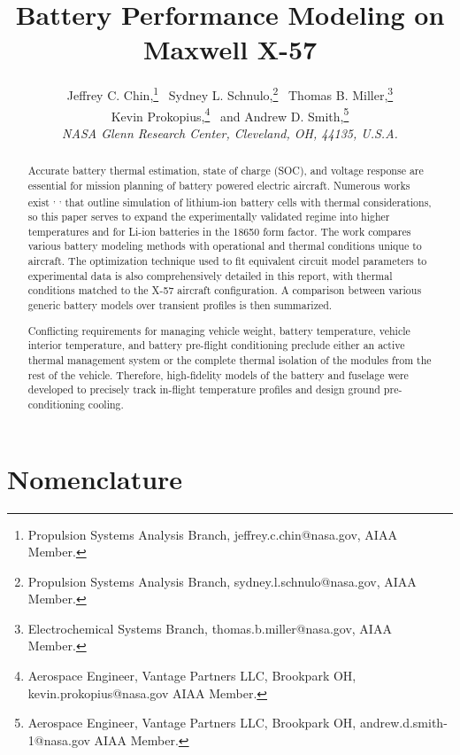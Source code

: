 \documentclass[]{aiaa-tc}%
\title{Battery Performance Modeling on Maxwell X-57}
\author{
  Jeffrey C. Chin,\thanks{Propulsion Systems Analysis Branch, jeffrey.c.chin@nasa.gov, AIAA Member.} \
  Sydney L. Schnulo,\thanks{Propulsion Systems Analysis Branch, sydney.l.schnulo@nasa.gov, AIAA Member.} \
  Thomas B. Miller,\thanks{Electrochemical Systems Branch, thomas.b.miller@nasa.gov, AIAA Member.} \\
  Kevin Prokopius,\thanks{Aerospace Engineer, Vantage Partners LLC, Brookpark OH, kevin.prokopius@nasa.gov AIAA Member.} \
  and Andrew D. Smith,\thanks{Aerospace Engineer, Vantage Partners LLC, Brookpark OH, andrew.d.smith-1@nasa.gov AIAA Member.} \\
  {\normalsize \itshape NASA Glenn Research Center, Cleveland, OH, 44135, U.S.A.} }
\begin{document}
\maketitle

\begin{abstract}

Accurate battery thermal estimation, state of charge (SOC), and voltage response are essential for mission planning of battery powered electric aircraft. Numerous works exist \cite{Hu} \textsuperscript{,} \cite{Hu2}\textsuperscript{,} \cite{Fotouhi} that outline simulation of lithium-ion battery cells with thermal considerations, so this paper serves to expand the experimentally validated regime into higher temperatures and for Li-ion batteries in the 18650 form factor. The work compares various battery modeling methods with operational and thermal conditions unique to aircraft. The optimization technique used to fit equivalent circuit model parameters to experimental data is also comprehensively detailed in this report, with thermal conditions matched to the X-57 aircraft configuration. A comparison between various generic battery models over transient profiles is then summarized.

Conflicting requirements for managing vehicle weight, battery temperature, vehicle interior temperature, and battery pre-flight conditioning preclude either an active thermal management system or the complete thermal isolation of the modules from the rest of the vehicle. Therefore, high-fidelity models of the battery and fuselage were developed to precisely track in-flight temperature profiles and design ground pre-conditioning cooling.

\end{abstract}


%
\section{Nomenclature}
\end{document}
